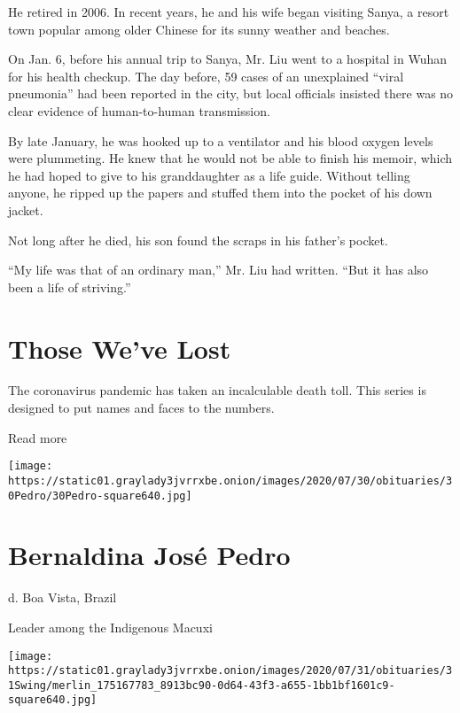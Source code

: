 He retired in 2006. In recent years, he and his wife began visiting
Sanya, a resort town popular among older Chinese for its sunny weather
and beaches.

On Jan. 6, before his annual trip to Sanya, Mr. Liu went to a hospital
in Wuhan for his health checkup. The day before, 59 cases of an
unexplained ``viral pneumonia'' had been reported in the city, but local
officials insisted there was no clear evidence of human-to-human
transmission.

By late January, he was hooked up to a ventilator and his blood oxygen
levels were plummeting. He knew that he would not be able to finish his
memoir, which he had hoped to give to his granddaughter as a life guide.
Without telling anyone, he ripped up the papers and stuffed them into
the pocket of his down jacket.

Not long after he died, his son found the scraps in his father's pocket.

``My life was that of an ordinary man,'' Mr. Liu had written. ``But it
has also been a life of striving.''

\href{https://www.nytimes3xbfgragh.onion/interactive/2020/obituaries/people-died-coronavirus-obituaries.html?action=click\&pgtype=Article\&state=default\&region=BELOW_MAIN_CONTENT\&context=covid_obits_promo}{}

\hypertarget{those-weve-lost}{%
\section{Those We've Lost}\label{those-weve-lost}}

The coronavirus pandemic has taken an incalculable death toll. This
series is designed to put names and faces to the numbers.

Read more

\texttt{[image: https://static01.graylady3jvrrxbe.onion/images/2020/07/30/obituaries/30Pedro/30Pedro-square640.jpg]}

\hypertarget{bernaldina-josuxe9-pedro}{%
\section{Bernaldina José Pedro}\label{bernaldina-josuxe9-pedro}}

d. Boa Vista, Brazil

Leader among the Indigenous Macuxi

\texttt{[image: https://static01.graylady3jvrrxbe.onion/images/2020/07/31/obituaries/31Swing/merlin\_175167783\_8913bc90-0d64-43f3-a655-1bb1bf1601c9-square640.jpg]}


